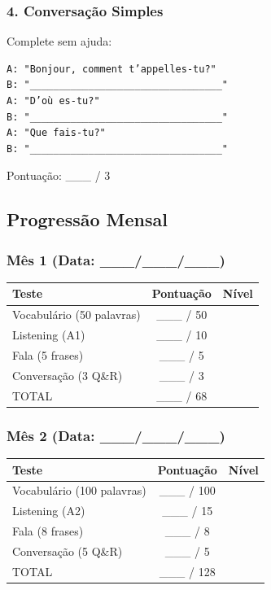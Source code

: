 \documentclass[a4paper,12pt]{article}
\begin{document}
\subsubsection{4. Conversação Simples}
Complete sem ajuda:
\begin{verbatim}
A: "Bonjour, comment t’appelles-tu?"
B: "_________________________________"
A: "D’où es-tu?"
B: "_________________________________"
A: "Que fais-tu?"
B: "_________________________________"
\end{verbatim}
Pontuação: \_\_\_ / 3

\subsection{Progressão Mensal}
\subsubsection{Mês 1 (Data: \_\_\_/\_\_\_/\_\_\_)}
\begin{tabular}{lcc}
    \toprule
    Teste & Pontuação & Nível \\
    \midrule
    Vocabulário (50 palavras) & \_\_\_ / 50 & \\
    Listening (A1) & \_\_\_ / 10 & \\
    Fala (5 frases) & \_\_\_ / 5 & \\
    Conversação (3 Q\&R) & \_\_\_ / 3 & \\
    TOTAL & \_\_\_ / 68 & \\
    \bottomrule
\end{tabular}

\subsubsection{Mês 2 (Data: \_\_\_/\_\_\_/\_\_\_)}
\begin{tabular}{lcc}
    \toprule
    Teste & Pontuação & Nível \\
    \midrule
    Vocabulário (100 palavras) & \_\_\_ / 100 & \\
    Listening (A2) & \_\_\_ / 15 & \\
    Fala (8 frases) & \_\_\_ / 8 & \\
    Conversação (5 Q\&R) & \_\_\_ / 5 & \\
    TOTAL & \_\_\_ / 128 & \\
    \bottomrule
\end{tabular}
\end{document}
